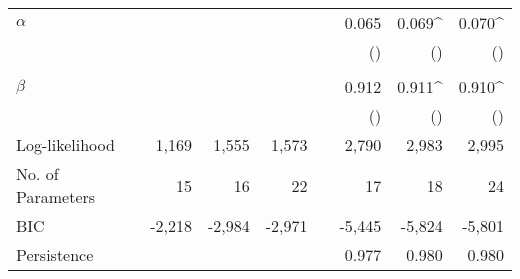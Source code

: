 \begin{table}[!ht]
\begin{tabularx}{\textwidth}{@{}l ddd X ddd @{}}
    $\alpha$ & & & && 0.065 & 0.069^{} & 0.070^{} \\
    & & & && () & () & () \\
    \\
    $\beta$ & & & && 0.912 & 0.911^{} & 0.910^{} \\
    & & & && () & () & () \\
    \midrule
    Log-likelihood & 1,169 & 1,555 & 1,573 && 2,790 & 2,983 & 2,995 \\
    No. of Parameters & 15 & 16 & 22 && 17 & 18 & 24 \\
    BIC & -2,218 & -2,984 & -2,971 && -5,445 & -5,824 & -5,801 \\
    Persistence & & & && 0.977 & 0.980 & 0.980 \\
    \bottomrule
  \end{tabularx}

  \label{tab:copula_estimation}
\end{table}
